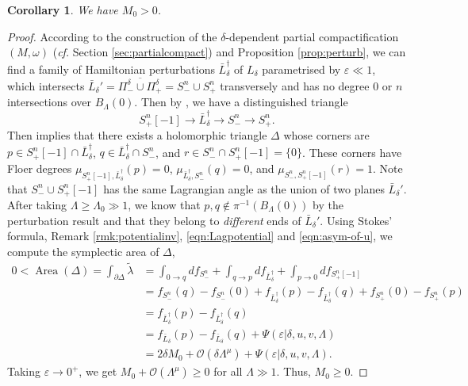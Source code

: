 \documentclass[11pt,a4paper]{article}
\numberwithin{equation}{section}%
\newtheorem{cor}[thm]{Corollary}
\theoremstyle{definition}
\newcommand{\cf}{\emph{cf.} }
\begin{document}
\begin{cor}\label{cor:M0>0}
    We have $M_0>0$. 
\end{cor}

\begin{proof}
   According to the construction of the $\delta$-dependent partial compactification $(M,\omega)$ (\cf Section \ref{sec:partialcompact}) and Proposition \ref{prop:perturb}, we can find a family of Hamiltonian perturbations $\bar L_\delta^\dagger$ of $L_\delta$ parametrised by $\varepsilon\ll 1$, which intersects $\bar L_\delta'=\overline{\Pi_-^\delta\cup\Pi_+^\delta}=S_-^n\cup S_+^n$ transversely and has no degree $0$ or $n$ intersections over $B_\Lambda(0)$. Then by \cite[Theorem 2.17]{IJS}, 
    we have a distinguished triangle 
    $$S_+^n[-1]\to \bar L_\delta^{\dagger}\to S_-^n\to S_+^n. $$
    Then \cite[Theorem 2.16]{IJS} implies that there exists a holomorphic triangle $\Delta$ whose corners are $p\in S_{+}^n[-1]\cap \bar L_\delta^{\dagger}$, $q\in \bar L_\delta^{\dagger}\cap S_-^n$, and $r\in  S_-^n\cap S_+^n[-1]=\{0\}$. These corners have Floer degrees $\mu_{S_{+}^n[-1], \bar L_\delta^{\dagger}}(p)=0$, $\mu_{\bar L_\delta^{\dagger}, S_-^n}(q)=0$, and $\mu_{S_-^n,S_{+}^n[-1]}(r)=1$. Note that $S_-^n\cup S_+^n[-1]$ has the same Lagrangian angle as the union of two planes $\bar L_\delta'$. After taking $\Lambda \geqslant \Lambda_0\gg 1$, we know that $p,q\notin \pi^{-1}(B_{\Lambda}(0))$ by the perturbation result and that they belong to \textit{different} ends of $\bar L_{\delta}'$. Using Stokes' formula, Remark \eqref{rmk:potentialinv}, \eqref{eqn:Lagpotential} and \eqref{eqn:asym-of-u}, we compute the symplectic area of $\Delta$, 
    \begin{equation*}
        \begin{aligned}
            0<\operatorname{Area}(\Delta)=\int_{\partial \Delta}\tilde{\lambda}&=\int_{0\to q}df_{S_-^n}+\int_{q\to p}df_{\bar L_\delta^\dagger}+\int_{p\to 0}df_{S^n_+[-1]}
            \\&=f_{S_-^n}(q)-f_{S_-^n}(0)+f_{\bar L_\delta^\dagger}(p)-f_{\bar L_\delta^\dagger}(q)+f_{S_+^n}(0)-f_{S_+^n}(p)\quad
            \\&=f_{\bar L_\delta^\dagger}(p)-f_{\bar L_\delta^\dagger}(q)
            \\&=f_{\bar L_\delta}(p)-f_{\bar L_\delta}(q)+\Psi(\varepsilon|\delta,u,v,\Lambda)
            \\&= 2\delta M_0+\mathcal{O}(\delta \Lambda^\mu)+\Psi(\varepsilon|\delta,u,v,\Lambda).
        \end{aligned}
    \end{equation*}
Taking $\varepsilon \to 0^+$, we get $M_0+\mathcal{O}(\Lambda^\mu)\geqslant 0$ for all $\Lambda \gg 1$. Thus, $M_0\geqslant 0$. 


\end{proof}
\end{document}
